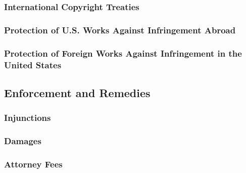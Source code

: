 
\subsubsection{International Copyright Treaties}


\subsubsection{Protection of U.S. Works Against Infringement Abroad}


\subsubsection{Protection of Foreign Works Against Infringement in the United 
States}


\subsection{Enforcement and Remedies}

\subsubsection{Injunctions}


\subsubsection{Damages}


\subsubsection{Attorney Fees}

